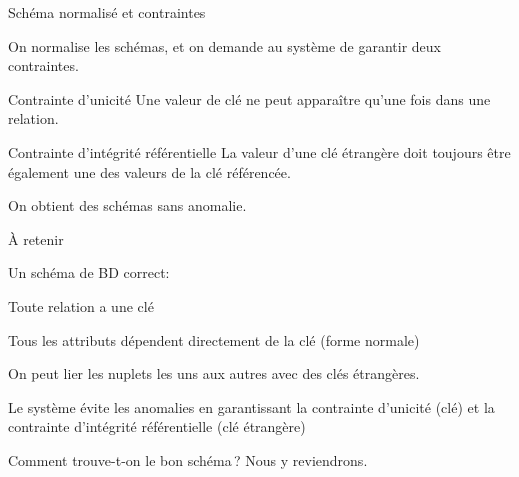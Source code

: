 \begin{frame}{Schéma normalisé et  contraintes}
 
On normalise les schémas, et on demande au système de garantir deux contraintes.

\begin{defblock}{Contrainte d'unicité}
Une valeur de clé ne peut apparaître \alert{qu'une fois} dans une relation.
\end{defblock}
 
\vfill

\begin{defblock}{Contrainte d'intégrité référentielle}
La valeur d'une clé étrangère doit \alert{toujours}
   être également une des valeurs de la clé référencée.\end{defblock}

\vfill

\begin{blocgauche}
On obtient des schémas sans anomalie.
\end{blocgauche}

\end{frame}


\begin{frame}{À retenir}

Un schéma de BD correct:
\vfill
\begin{redbullet}
  \item Toute relation a une clé
 \item Tous les attributs dépendent \alert{directement} de la clé (forme normale)
 \item On peut lier les nuplets les uns aux autres avec des clés étrangères.
 \item Le système évite les anomalies en garantissant
    la \alert{contrainte d'unicité} (clé) et la \alert{contrainte d'intégrité référentielle} (clé étrangère)
\end{redbullet}

\vfill

\alert{Comment trouve-t-on le bon schéma\,?} Nous y reviendrons.
\end{frame}

